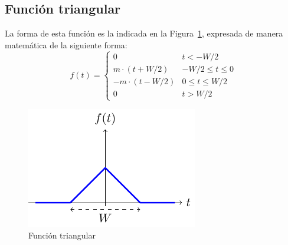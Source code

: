 \documentclass[11pt]{book} %
\begin{document}
	\subsection{Función triangular}
	La forma de esta función es la indicada en la Figura~\ref{fig.triangular}, expresada de manera matemática de la siguiente forma: 
	\begin{equation}
		\boxed{
			f(t) = %
			\begin{cases}
				0 & t < -W/2\\
				m \cdot (t + W/2)  & -W/2 \leq t \leq 0\\
				-m \cdot (t - W/2)  & 0 \leq t \leq W/2\\
				0  & t > W/2
		\end{cases}}
	\end{equation}
	\begin{figure}[htbp]
		\centering
		\includegraphics[width=0.35\linewidth]{../figs/triangular.pdf}
		\caption{Función triangular}
		\label{fig.triangular}
	\end{figure}
	
\end{document}
